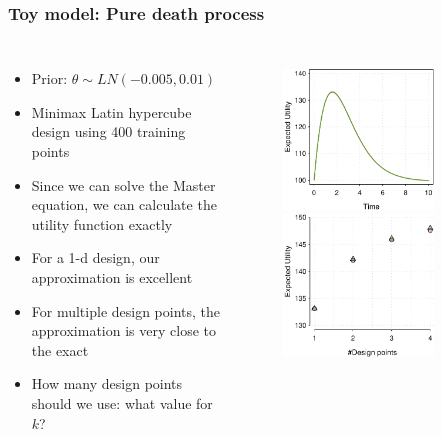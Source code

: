 \documentclass[t,compress]{beamer}
\begin{document}
\begin{frame}
\frametitle{Toy model: Pure death process}
\begin{columns}[c]
\begin{itemize}
\item Prior: $\theta \sim LN(-0.005, 0.01)$
\item Minimax Latin hypercube design using 400 training points
\item Since we can solve the Master equation, we can calculate the
  utility function exactly
\item For a 1-d design, our approximation is excellent
\item For multiple design points, the approximation is very close to the exact
\item How many design points should we use: what value for $k$?
\end{itemize} 
\begin{figure}[t]
\includegraphics[width=0.8\textwidth]{figure4a-crop.pdf}\\
\includegraphics[width=0.8\textwidth]{figure4b-crop.pdf}
\end{figure}
\end{columns}
\end{frame}
\end{document}
